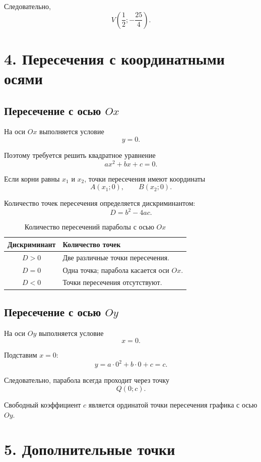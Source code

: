 \documentclass[a4paper,12pt]{article}
\begin{document}
Следовательно,
\[
  V\left(\frac12;-\frac{25}{4}\right).
\]

\section*{4. Пересечения с координатными осями}

\subsection*{Пересечение с осью \(Ox\)}

На оси \(Ox\) выполняется условие
\[
  y=0.
\]

Поэтому требуется решить квадратное уравнение
\[
  ax^2+bx+c=0.
\]

Если корни равны \(x_1\) и \(x_2\), точки пересечения имеют координаты
\[
  A(x_1;0),
  \qquad
  B(x_2;0).
\]

Количество точек пересечения определяется дискриминантом:
\[
  D=b^2-4ac.
\]

\begin{table}[ht]
  \centering
  \caption{Количество пересечений параболы с осью \(Ox\)}
  \renewcommand{\arraystretch}{1.35}
  \begin{tabularx}{0.8\linewidth}{@{}cX@{}}
    \toprule
    \textbf{Дискриминант} & \textbf{Количество точек} \\
    \midrule
    \(D>0\) & Две различные точки пересечения. \\
    \(D=0\) & Одна точка; парабола касается оси \(Ox\). \\
    \(D<0\) & Точки пересечения отсутствуют. \\
    \bottomrule
  \end{tabularx}
\end{table}

\subsection*{Пересечение с осью \(Oy\)}

На оси \(Oy\) выполняется условие
\[
  x=0.
\]

Подставим \(x=0\):
\[
  y=a\cdot 0^2+b\cdot 0+c=c.
\]

Следовательно, парабола всегда проходит через точку
\[
  \boxed{Q(0;c)}.
\]

Свободный коэффициент \(c\) является ординатой точки пересечения графика с осью \(Oy\).

\section*{5. Дополнительные точки}
\end{document}
